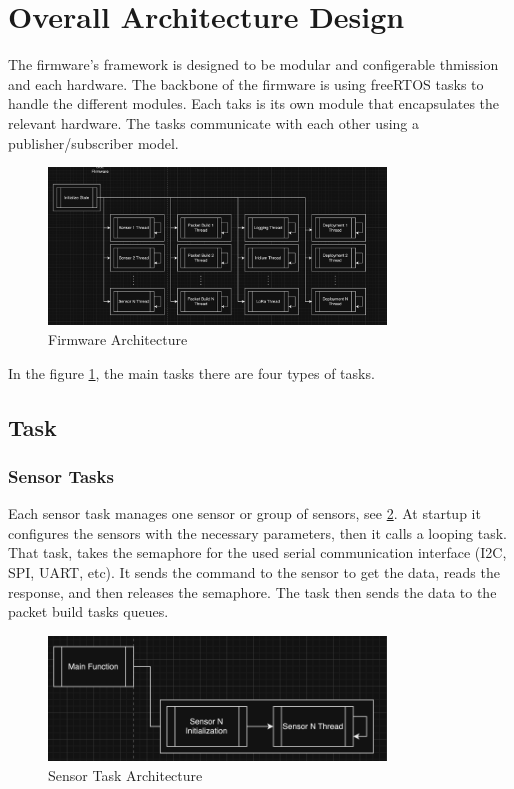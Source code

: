 \documentclass{book}
\begin{document}
\section{Overall Architecture Design}
\par The firmware's framework is designed to be modular and configerable thmission and each hardware. The backbone of the firmware is using freeRTOS tasks to handle the different modules. Each taks is its own module that encapsulates the relevant hardware. The tasks communicate with each other using a publisher/subscriber model.

\begin{figure} [H]
    \centering
    \includegraphics[width=0.8\textwidth]{images/firmware-architecture.png}
    \caption{Firmware Architecture}
    \label{fig:firmware-architecture} 
\end{figure}

\par In the figure \ref{fig:firmware-architecture}, the main tasks there are four types of tasks. 
\subsection{Task}
\subsubsection{Sensor Tasks}
\par Each sensor task manages one sensor or group of sensors, see \ref{fig:sensor-architecture}. At startup it configures the sensors with the necessary parameters, then it calls a looping task. That task, takes the semaphore for the used serial communication interface (I2C, SPI, UART, etc). It sends the command to the sensor to get the data, reads the response, and then releases the semaphore. The task then sends the data to the packet build tasks queues.

\begin{figure} [H]
    \centering
    \includegraphics[width=0.8\textwidth]{images/sensor-architechure.png}
    \caption{Sensor Task Architecture}
    \label{fig:sensor-architecture} 
\end{figure} 
\end{document}
